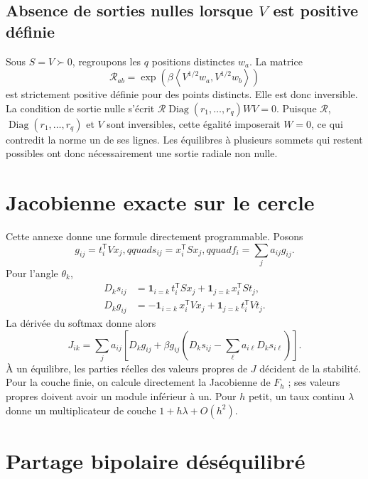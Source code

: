 \documentclass[11pt,a4paper]{article}
\theoremstyle{definition}
\newcommand{\Diag}{\operatorname{Diag}}
\newcommand{\T}{\mathsf T}
\newcommand{\ip}[2]{\left\langle #1,#2\right\rangle}
\begin{document}
\subsection{Absence de sorties nulles lorsque \texorpdfstring{$V$}{V} est positive définie}

Sous $S=V\succ0$, regroupons les $q$ positions distinctes $w_a$. La matrice
\[
 \mathcal R_{ab}=\exp\!\left(\beta
 \ip{V^{1/2}w_a}{V^{1/2}w_b}\right)
\]
est strictement positive définie pour des points distincts. Elle est donc inversible. La
condition de sortie nulle s'écrit
$\mathcal R\Diag(r_1,\ldots,r_q)WV=0$. Puisque
$\mathcal R$, $\Diag(r_1,\ldots,r_q)$ et $V$ sont inversibles, cette égalité imposerait
$W=0$, ce qui contredit la norme un de ses lignes. Les
équilibres à plusieurs sommets qui restent possibles ont donc nécessairement une sortie
radiale non nulle.

\section{Jacobienne exacte sur le cercle}
\label{app:jacobian}

Cette annexe donne une formule directement programmable. Posons
\[
 g_{ij}=t_i^{\T}Vx_j,qquad s_{ij}=x_i^{\T}Sx_j,qquad
 f_i=\sum_j a_{ij}g_{ij}.
\]
Pour l'angle $\theta_k$,
\begin{align}
 D_k s_{ij}
 &=\mathbf 1_{i=k}\,t_i^{\T}Sx_j
 +\mathbf 1_{j=k}\,x_i^{\T}St_j,\\
 D_k g_{ij}
 &=-\mathbf 1_{i=k}\,x_i^{\T}Vx_j
 +\mathbf 1_{j=k}\,t_i^{\T}Vt_j.
\end{align}
La dérivée du softmax donne alors
\begin{equation}
 \boxed{
 J_{ik}=\sum_j a_{ij}\left[
 D_k g_{ij}+\beta g_{ij}
 \left(D_k s_{ij}-\sum_\ell a_{i\ell}D_k s_{i\ell}\right)
 \right].}                                                \label{eq:circle-jacobian}
\end{equation}
À un équilibre, les parties réelles des valeurs propres de $J$ décident de la stabilité.
Pour la couche finie, on calcule directement la Jacobienne de $F_h$ ; ses valeurs propres
doivent avoir un module inférieur à un. Pour $h$ petit, un taux continu $\lambda$ donne
un multiplicateur de couche $1+h\lambda+O(h^2)$.

\section{Partage bipolaire déséquilibré}
\label{app:imbalanced}
\end{document}
